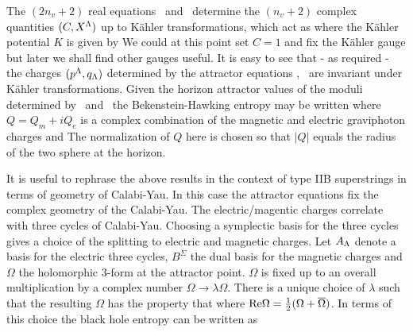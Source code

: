 The $(2n_v+2)$ real equations \prf\ and \qrf\ determine the
$(n_v+2)$
complex quantities $(C,X^{\Lambda})$ up to K\"ahler transformations, which
act as \eqn{} where the K\"ahler
potential $K$ is given by \eqn{}  We could at this point set
$C=1$ and fix the K\"ahler gauge but later we shall find other
gauges useful. It is easy to see that - as required - the charges
$(p^{\Lambda},q_{\Lambda})$ determined by the attractor equations \prf, \qrf\
are invariant under K\"ahler transformations. Given the horizon
attractor values of the moduli determined by \prf\ and \qrf\ the
Bekenstein-Hawking entropy may be written \eqn\ent{S_{BH}={1 \over
4}{\rm Area} ={\pi } |Q|^2 ,} where $Q=Q_m + i Q_e$ is a
complex combination of the magnetic and electric graviphoton charges
and \eqn{} The
normalization of $Q$ here is chosen so that $|Q|$ equals the radius
of the two sphere at the horizon.

It is useful to rephrase the above results in the context of type
IIB superstrings in terms of geometry of Calabi-Yau.  In this case
the attractor equations fix the complex geometry of the
Calabi-Yau.  The electric/magentic charges correlate with three
cycles of Calabi-Yau.  Choosing a symplectic basis for the three
cycles gives a choice of the splitting to electric and magnetic
charges.  Let $A_{\Lambda}$ denote a basis for the electric three cycles,
$B^\Sigma $ the dual basis for the magnetic charges and $\Omega$
the holomorphic 3-form at the attractor point. $\Omega$ is fixed
up to an overall multiplication by a complex number $\Omega
\rightarrow \lambda \Omega$. There is a unique choice of $\lambda$
such that the resulting $\Omega$ has the property that
%
\eqn{}
%
where ${\rm Re} \Omega={1\over 2} (\Omega+{\overline \Omega})$.
In terms of this choice the black hole entropy can be written as
%
\eqn\dss{S_{BH}={\pi \over 4} \int_{CY} \Omega \wedge {\overline
\Omega}}
%




